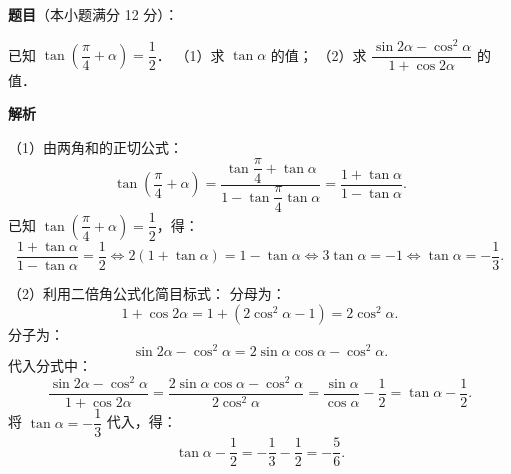 \begin{answer}

\textbf{题目}（本小题满分 12 分）：

已知 $\tan\left(\dfrac{\pi}{4} + \alpha\right) = \dfrac{1}{2}$．
（1）求 $\tan\alpha$ 的值；
（2）求 $\dfrac{\sin 2\alpha - \cos^2\alpha}{1 + \cos 2\alpha}$ 的值．

\textbf{解析}

（1）由两角和的正切公式：
\nopagebreak[4]
\[
\tan\left(\dfrac{\pi}{4} + \alpha\right) = \dfrac{\tan\dfrac{\pi}{4} + \tan\alpha}{1 - \tan\dfrac{\pi}{4}\tan\alpha} = \dfrac{1 + \tan\alpha}{1 - \tan\alpha}.
\]
已知 $\tan\left(\dfrac{\pi}{4} + \alpha\right) = \dfrac{1}{2}$，得：
\nopagebreak[4]
\[
\dfrac{1 + \tan\alpha}{1 - \tan\alpha} = \dfrac{1}{2} \iff 2(1 + \tan\alpha) = 1 - \tan\alpha \iff 3\tan\alpha = -1 \iff \tan\alpha = -\dfrac{1}{3}.
\]

（2）利用二倍角公式化简目标式：
分母为：
\nopagebreak[4]
\[
1 + \cos 2\alpha = 1 + (2\cos^2\alpha - 1) = 2\cos^2\alpha.
\]
分子为：
\nopagebreak[4]
\[
\sin 2\alpha - \cos^2\alpha = 2\sin\alpha\cos\alpha - \cos^2\alpha.
\]
代入分式中：
\nopagebreak[4]
\[
\dfrac{\sin 2\alpha - \cos^2\alpha}{1 + \cos 2\alpha} = \dfrac{2\sin\alpha\cos\alpha - \cos^2\alpha}{2\cos^2\alpha} = \dfrac{\sin\alpha}{\cos\alpha} - \dfrac{1}{2} = \tan\alpha - \dfrac{1}{2}.
\]
将 $\tan\alpha = -\dfrac{1}{3}$ 代入，得：
\nopagebreak[4]
\[
\tan\alpha - \dfrac{1}{2} = -\dfrac{1}{3} - \dfrac{1}{2} = -\dfrac{5}{6}.
\]


\end{answer}
